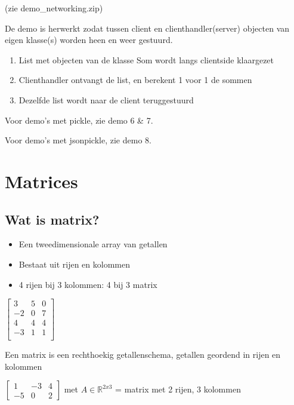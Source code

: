 \documentclass{article}
\begin{document}
(zie demo\_networking.zip)

De demo is herwerkt zodat tussen client en clienthandler(server) objecten van 
eigen klasse(s) worden heen en weer gestuurd. 

\begin{enumerate}
    \item List met objecten van de klasse Som wordt langs clientside klaargezet
    \item Clienthandler ontvangt de list, en berekent 1 voor 1 de sommen
    \item Dezelfde list wordt naar de client teruggestuurd
\end{enumerate}

Voor demo's met pickle, zie demo 6 \& 7.

Voor demo's met jsonpickle, zie demo 8.

\section{Matrices}

\subsection{Wat is matrix?}

\begin{itemize}
    \item Een tweedimensionale array van getallen
    \item Bestaat uit rijen en kolommen
    \item 4 rijen bij 3 kolommen: 4 bij 3 matrix
\end{itemize}

\begin{center}
    $\begin{bmatrix}
        3 & 5 & 0\\
        -2 & 0 & 7\\
        4 & 4 & 4\\
        -3 & 1 & 1\\
    \end{bmatrix}$
\end{center}


Een matrix is een rechthoekig getallenschema, getallen geordend in rijen en kolommen

\begin{center}
    $\begin{bmatrix}
        1 & -3 & 4\\
        -5 & 0 & 2
    \end{bmatrix}$ met $A \in \mathbb{R}^{2x3}$ = matrix met 2 rijen, 3 kolommen        
\end{center}
\end{document}
